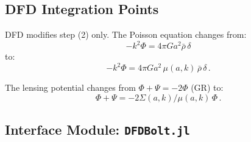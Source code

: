 \documentclass[11pt,a4paper]{article}
\begin{document}
\subsection{DFD Integration Points}

DFD modifies step (2) only. The Poisson equation changes from:
\begin{equation}
-k^2\Phi = 4\pi G a^2 \bar{\rho}\,\delta
\end{equation}
to:
\begin{equation}
-k^2\Phi = 4\pi G a^2\,\mu(a,k)\,\bar{\rho}\,\delta\,.
\end{equation}

The lensing potential changes from $\Phi + \Psi = -2\Phi$ (GR) to:
\begin{equation}
\Phi + \Psi = -2\Sigma(a,k)/\mu(a,k)\,\Phi\,.
\end{equation}

\subsection{Interface Module: \texttt{DFDBolt.jl}}
\end{document}

